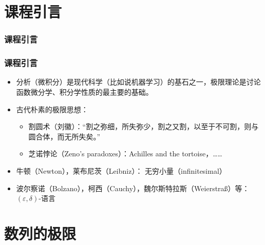 \section{课程引言} %

\begin{frame}
\frametitle{课程引言}

\begin{figure}[H]
\centering
{}
\end{figure}

\end{frame}


\begin{frame}
\frametitle{课程引言}

\begin{itemize}
\item<1-> 分析（微积分）是现代科学（比如说机器学习）的基石之一，极限理论是讨论函数微分学、积分学性质的最主要的基础。

\item<2-> 古代朴素的极限思想：
\begin{itemize}
\item[$\bullet$]<3-> 割圆术（刘徽）：``割之弥细，所失弥少，割之又割，以至于不可割，则与圆合体，而无所失矣。''
\item[$\bullet$]<4-> 芝诺悖论（Zeno's paradoxes）：Achilles and the tortoise，\ldots\ldots
\end{itemize}
\item<5-> 牛顿（Newton），莱布尼茨（Leibniz）：{\color{red} 无穷小量（infinitesimal）}
\item<6-> 波尔察诺（Bolzano），柯西（Cauchy），魏尔斯特拉斯（Weierstra\ss）等：{\color{red}$(\varepsilon, \delta)$-语言}
\end{itemize}

\end{frame}


\section{数列的极限}

